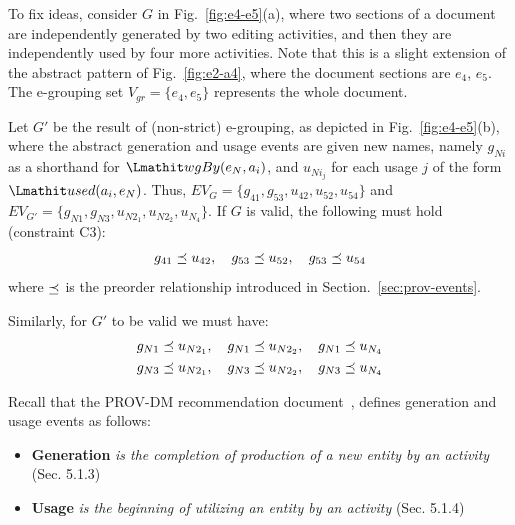 To fix ideas, consider $G$ in Fig.~\ref{fig:e4-e5}(a), where two sections of a document are independently generated by two editing activities, and then they are independently used by four more activities. Note that this is a slight extension of the abstract pattern of Fig.~\ref{fig:e2-a4}, where the document sections are $e_4$, $e_5$.
%
The e-grouping set $V_{gr} = \{ e_4, e_5\}$ represents the whole document. 

Let $G'$ be the result of (non-strict) e-grouping, as depicted in Fig.~\ref{fig:e4-e5}(b), where the abstract generation and usage events are given new names, namely $g_{Ni}$ as a shorthand for $\wgby(e_N,a_i)$, and $u_{Ni_j}$ for each usage $j$ of the form $\used(a_i, e_N)$. 
Thus, $EV_G = \{ g_{41}, g_{53}, u_{42}, u_{52}, u_{54} \}$ and $EV_{G'} = \{ g_{N1}, g_{N3}, u_{N2_1}, u_{N2_2}, u_{N_4} \}$.
%
If $G$ is valid, the following must hold (constraint C3):
\begin{align}
\label{eq:c3-G}
g_{41} \preceq u_{42}, \quad g_{53} \preceq u_{52}, \quad g_{53} \preceq u_{54} 
\end{align}
where $\preceq$ is the preorder relationship introduced in Section.~\ref{sec:prov-events}.

Similarly, for $G'$ to be valid we must have:
\begin{align}
g_{N1} \preceq u_{N2_1}, \quad g_{N1} \preceq u_{N2_2}, \quad g_{N1} \preceq u_{N_4}  \label{eq:c3-global1} \\  
g_{N3} \preceq u_{N2_1}, \quad g_{N3} \preceq u_{N2_2}, \quad g_{N3} \preceq u_{N_4} \label{eq:c3-global2} 
\end{align}

Recall that the PROV-DM recommendation document~\citep{w3c-prov-dm}, defines generation and usage events as follows:
\begin{itemize}
	\item\textbf{Generation} \textit{is the completion of production of a new entity by an activity} (Sec. 5.1.3)
	\item\textbf{Usage} \textit{is the beginning of utilizing an entity by an activity} (Sec. 5.1.4)
\end{itemize}

